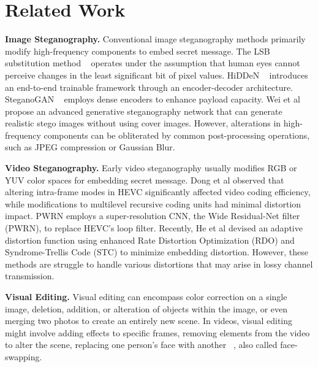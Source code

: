 \documentclass{article}
\begin{document}
\section{Related Work}
\textbf{Image Steganography.}
Conventional image steganography methods primarily modify high-frequency components to embed secret message. The LSB substitution method ~\cite{chan2004lsb} operates under the assumption that human eyes cannot perceive changes in the least significant bit of pixel values.
HiDDeN ~\cite{zhu2018hidden} introduces an end-to-end trainable framework through an encoder-decoder architecture.
SteganoGAN ~\cite{zhang2019steganogan} employs dense encoders to enhance payload capacity. Wei et al ~\cite{wei2022generative} propose an advanced generative steganography network that can generate realistic stego images without using cover images.
However, alterations in high-frequency components can be obliterated by common post-processing operations, such as JPEG compression or Gaussian Blur.


\noindent\textbf{Video Steganography.} Early video steganography usually modifies RGB or YUV color spaces for embedding secret message.
Dong et al \cite{dong2019high} observed that altering intra-frame modes in HEVC significantly affected video coding efficiency, while modifications to multilevel recursive coding units had minimal distortion impact.
PWRN \cite{li2022anti} employs a super-resolution CNN, the Wide Residual-Net filter (PWRN), to replace HEVC's loop filter.
Recently, He et al \cite{he2023adaptive} devised an adaptive distortion function using enhanced Rate Distortion Optimization (RDO) and Syndrome-Trellis Code (STC) to minimize embedding distortion.
However, these methods are struggle to handle various distortions that may arise in lossy channel transmission.

\noindent\textbf{Visual Editing.}
Visual editing can encompass color correction on a single image, deletion, addition, or alteration of objects within the image, or even merging two photos to create an entirely new scene. In videos, visual editing might involve adding effects to specific frames, removing elements from the video to alter the scene, replacing one person's face with another ~\cite{chen2020simswap}, also called face-swapping.
\end{document}
